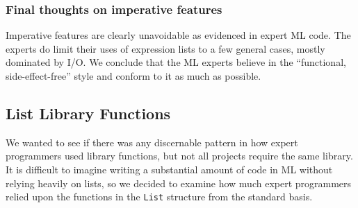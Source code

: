 \documentclass[12pt,abstracton]{scrartcl}
\begin{document}
\subsubsection{Final thoughts on imperative features}
Imperative features are clearly unavoidable as evidenced in expert ML code. The experts do
limit their uses of expression lists to a few general cases, mostly dominated by I/O.
We conclude that the ML experts believe in the ``functional, side-effect-free'' style
and conform to it as much as possible.
\subsection{List Library Functions}\label{subsec:list}
We wanted to see if there was any discernable pattern in how expert programmers
used library functions, but not all projects require the same library.
It is difficult to imagine writing a substantial amount of code in ML without
relying heavily on lists, so we decided to examine how much expert programmers relied upon the functions
in the \texttt{List} structure from the standard basis.
\end{document}
